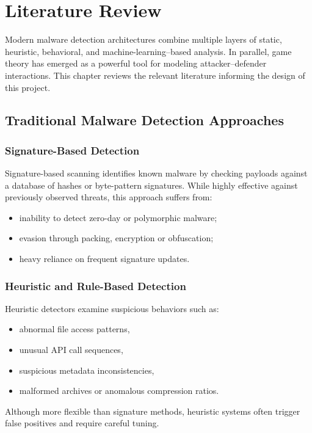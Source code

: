 \documentclass[12pt, a4paper]{report}
\begin{document}
\cleardoublepage



\chapter{Literature Review}
\label{chap:lit_review}

Modern malware detection architectures combine multiple layers of static,
heuristic, behavioral, and machine-learning–based analysis. In parallel,
game theory has emerged as a powerful tool for modeling attacker–defender
interactions. This chapter reviews the relevant literature informing the
design of this project.

\section{Traditional Malware Detection Approaches}

\subsection{Signature-Based Detection}
Signature-based scanning identifies known malware by checking payloads
against a database of hashes or byte-pattern signatures. While highly
effective against previously observed threats, this approach suffers from:
\begin{itemize}
    \item inability to detect zero-day or polymorphic malware;
    \item evasion through packing, encryption or obfuscation;
    \item heavy reliance on frequent signature updates.
\end{itemize}

\subsection{Heuristic and Rule-Based Detection}
Heuristic detectors examine suspicious behaviors such as:
\begin{itemize}
    \item abnormal file access patterns,
    \item unusual API call sequences,
    \item suspicious metadata inconsistencies,
    \item malformed archives or anomalous compression ratios.
\end{itemize}
Although more flexible than signature methods, heuristic systems often trigger
false positives and require careful tuning.
\end{document}
